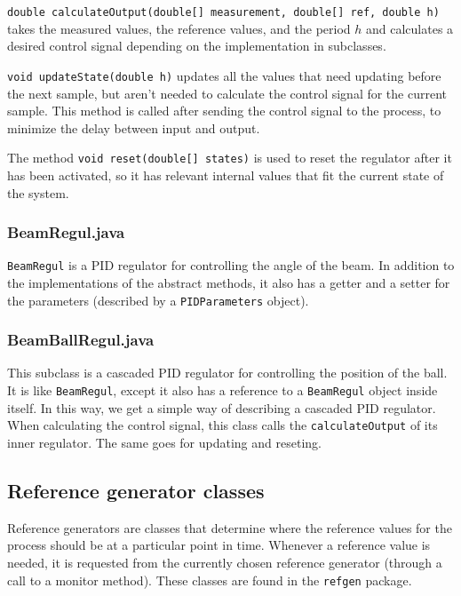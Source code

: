\texttt{double calculateOutput(double[] measurement, double[] ref, double h)} takes the measured values, the reference values, and the period $h$ and calculates a desired control signal depending on the implementation in subclasses.

\texttt{void updateState(double h)} updates all the values that need updating before the next sample, but aren't needed to calculate the control signal for the current sample. This method is called after sending the control signal to the process, to minimize the delay between input and output.

The method \texttt{void reset(double[] states)} is used to reset the regulator after it has been activated, so it has relevant internal values that fit the current state of the system.

\subsubsection{BeamRegul.java}
\texttt{BeamRegul} is a PID regulator for controlling the angle of the beam. In addition to the implementations of the abstract methods, it also has a getter and a setter for the parameters (described by a \texttt{PIDParameters} object).

\subsubsection{BeamBallRegul.java}
This subclass is a cascaded PID regulator for controlling the position of the ball. It is like \texttt{BeamRegul}, except it also has a reference to a \texttt{BeamRegul} object inside itself. In this way, we get a simple way of describing a cascaded PID regulator. When calculating the control signal, this class calls the \texttt{calculateOutput} of its inner regulator. The same goes for updating and reseting.








\subsection{Reference generator classes}
Reference generators are classes that determine where the reference values for the process should be at a particular point in time. Whenever a reference value is needed, it is requested from the currently chosen reference generator  (through a call to a monitor method). These classes are found in the \texttt{refgen} package.
 
